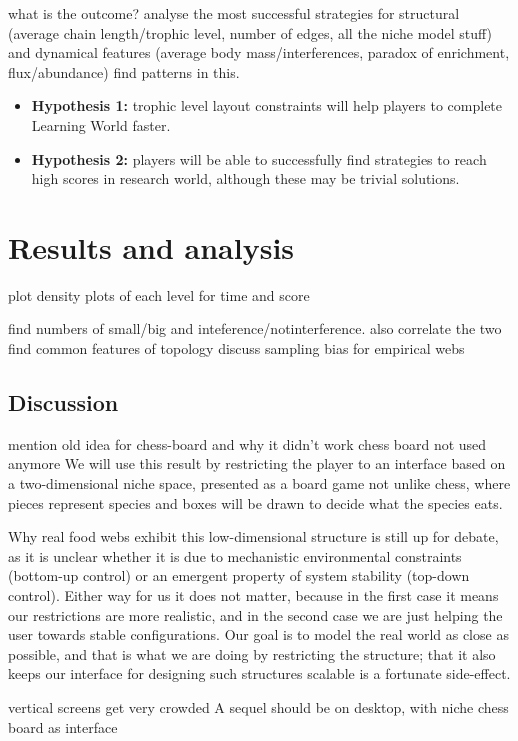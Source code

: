 what is the outcome? analyse the most successful strategies for structural (average chain length/trophic level, number of edges, all the niche model stuff) and dynamical features (average body mass/interferences, paradox of enrichment, flux/abundance)
find patterns in this.

\begin{mdframed}[backgroundcolor=WhiteSmoke]
  \begin{itemize}[leftmargin=*]
    \item \textbf{Hypothesis 1:} trophic level layout constraints will help players to complete Learning World faster.
    \item \textbf{Hypothesis 2:} players will be able to successfully find strategies to reach high scores in research world, although these may be trivial solutions.
  \end{itemize}
\end{mdframed}

\section{Results and analysis}

plot density plots of each level for time and score

find numbers of small/big and inteference/notinterference. also correlate the two
find common features of topology
discuss sampling bias for empirical webs

\subsection{Discussion}
\label{sec:eco_discussion}

  mention old idea for chess-board and why it didn't work
     chess board not used anymore
        We will use this result by restricting the player to an interface based on a two-dimensional niche space, presented as a board game not unlike chess, where pieces represent species and boxes will be drawn to decide what the species eats.

        Why real food webs exhibit this low-dimensional structure is still up for debate, as it is unclear whether it is due to mechanistic environmental constraints (bottom-up control) or an emergent property of system stability (top-down control).
        Either way for us it does not matter, because in the first case it means our restrictions are more realistic, and in the second case we are just helping the user towards stable configurations.
        Our goal is to model the real world as close as possible, and that is what we are doing by restricting the structure; that it also keeps our interface for designing such structures scalable is a fortunate side-effect.

vertical screens get very crowded
A sequel should be on desktop, with niche chess board as interface